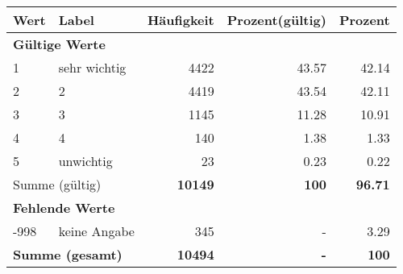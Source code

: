      \begin{longtable}{lXrrr}
     \toprule
     \textbf{Wert} & \textbf{Label} & \textbf{Häufigkeit} & \textbf{Prozent(gültig)} & \textbf{Prozent} \\
     \endhead
     \midrule
     \multicolumn{5}{l}{\textbf{Gültige Werte}}\\

     1 &
     \multicolumn{1}{X}{ sehr wichtig   } &


       \num{4422} &
       \num[round-mode=places,round-precision=2]{43,57} &
         \num[round-mode=places,round-precision=2]{42,14} \\

     2 &
     \multicolumn{1}{X}{ 2   } &


       \num{4419} &
       \num[round-mode=places,round-precision=2]{43,54} &
         \num[round-mode=places,round-precision=2]{42,11} \\

     3 &
     \multicolumn{1}{X}{ 3   } &


       \num{1145} &
       \num[round-mode=places,round-precision=2]{11,28} &
         \num[round-mode=places,round-precision=2]{10,91} \\

     4 &
     \multicolumn{1}{X}{ 4   } &


       \num{140} &
       \num[round-mode=places,round-precision=2]{1,38} &
         \num[round-mode=places,round-precision=2]{1,33} \\

     5 &
     \multicolumn{1}{X}{ unwichtig   } &


       \num{23} &
       \num[round-mode=places,round-precision=2]{0,23} &
         \num[round-mode=places,round-precision=2]{0,22} \\
     \midrule
     \multicolumn{2}{l}{Summe (gültig)} &
       \textbf{\num{10149}} &
     \textbf{100} &
       \textbf{\num[round-mode=places,round-precision=2]{96,71}} \\
     \multicolumn{5}{l}{\textbf{Fehlende Werte}}\\
       -998 &
       keine Angabe &
         \num{345} &
        - &
         \num[round-mode=places,round-precision=2]{3,29} \\
     \midrule
     \multicolumn{2}{l}{\textbf{Summe (gesamt)}} &
          \textbf{\num{10494}} &
        \textbf{-} &
        \textbf{100} \\
     \bottomrule
     \end{longtable}
     

